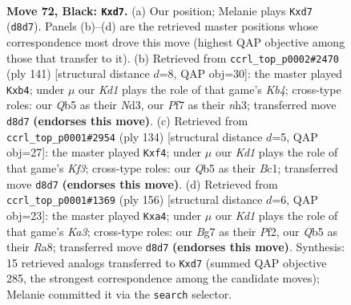 \documentclass[11pt]{article}
\begin{document}
\clearpage

\begin{figure}[p]\centering
\begin{subfigure}{0.46\textwidth}\centering
\resizebox{\linewidth}{!}{%
\newchessgame
\chessboard[
  setfen={3k4/3P1pb1/8/1q6/8/7K/8/8 b - - 8 72},
  showmover=false,
  pgfstyle=straightmove, color=movearrow, markmove={d8-d7}
]}
\caption{}
\end{subfigure}\hfill
\begin{subfigure}{0.46\textwidth}\centering
\resizebox{\linewidth}{!}{%
\newchessgame
\chessboard[
  setfen={8/6K1/8/1k6/1P6/3n3N/6p1/8 b - - 3 71},
  showmover=false,
  pgfstyle=straightmove, color=movearrow, markmove={b5-b4}
]}
\caption{}
\end{subfigure}
\\[4pt]
\begin{subfigure}{0.46\textwidth}\centering
\resizebox{\linewidth}{!}{%
\newchessgame
\chessboard[
  setfen={4b3/8/8/2P5/5p1k/5K2/8/2B5 w - - 0 68},
  showmover=false,
  pgfstyle=straightmove, color=movearrow, markmove={f3-f4}
]}
\caption{}
\end{subfigure}\hfill
\begin{subfigure}{0.46\textwidth}\centering
\resizebox{\linewidth}{!}{%
\newchessgame
\chessboard[
  setfen={R7/8/4k3/2P5/p7/K7/5P2/8 w - - 1 79},
  showmover=false,
  pgfstyle=straightmove, color=movearrow, markmove={a3-a4}
]}
\caption{}
\end{subfigure}
\caption{\textbf{Move 72, Black: \texttt{Kxd7}.} (a) Our position; Melanie plays \texttt{Kxd7} (\texttt{d8d7}). Panels (b)--(d) are the retrieved master positions whose correspondence most drove this move (highest QAP objective among those that transfer to it). (b) Retrieved from \texttt{ccrl\_top\_p0002\#2470} (ply 141) [structural distance $d$=8, QAP obj=30]: the master played \texttt{Kxb4}; under $\mu$ our \emph{Kd1} plays the role of that game's \emph{Kb4}; cross-type roles: our \emph{Q}b5 as their \emph{N}d3, our \emph{P}f7 as their \emph{n}h3; transferred move \texttt{d8d7} \textbf{(endorses this move)}. (c) Retrieved from \texttt{ccrl\_top\_p0001\#2954} (ply 134) [structural distance $d$=5, QAP obj=27]: the master played \texttt{Kxf4}; under $\mu$ our \emph{Kd1} plays the role of that game's \emph{Kf3}; cross-type roles: our \emph{Q}b5 as their \emph{B}c1; transferred move \texttt{d8d7} \textbf{(endorses this move)}. (d) Retrieved from \texttt{ccrl\_top\_p0001\#1369} (ply 156) [structural distance $d$=6, QAP obj=23]: the master played \texttt{Kxa4}; under $\mu$ our \emph{Kd1} plays the role of that game's \emph{Ka3}; cross-type roles: our \emph{B}g7 as their \emph{P}f2, our \emph{Q}b5 as their \emph{R}a8; transferred move \texttt{d8d7} \textbf{(endorses this move)}. Synthesis: 15 retrieved analogs transferred to \texttt{Kxd7} (summed QAP objective 285, the strongest correspondence among the candidate moves); Melanie committed it via the \texttt{search} selector.}
\label{fig:thought-m143}
\end{figure}
\end{document}
